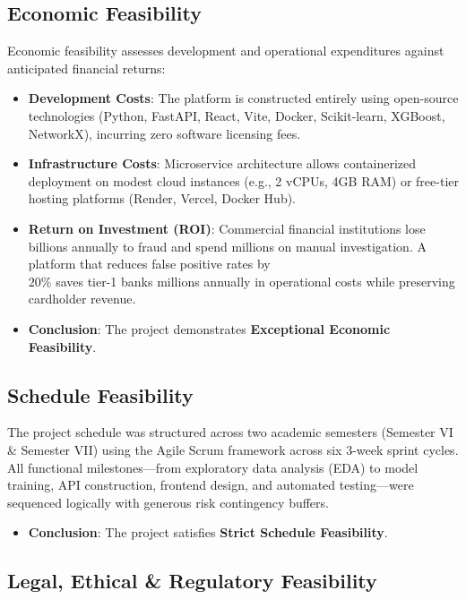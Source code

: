 \documentclass[12pt,a4paper,oneside]{report}
\begin{document}
\subsection{Economic Feasibility}

Economic feasibility assesses development and operational expenditures against anticipated financial returns:

\begin{itemize}[leftmargin=0.35in]
\item \textbf{Development Costs}: The platform is constructed entirely using open-source technologies (Python, FastAPI, React, Vite, Docker, Scikit-learn, XGBoost, NetworkX), incurring zero software licensing fees.
\item \textbf{Infrastructure Costs}: Microservice architecture allows containerized deployment on modest cloud instances (e.g., 2 vCPUs, 4GB RAM) or free-tier hosting platforms (Render, Vercel, Docker Hub).
\item \textbf{Return on Investment (ROI)}: Commercial financial institutions lose billions annually to fraud and spend millions on manual investigation. A platform that reduces false positive rates by \\$20\%$ saves tier-1 banks millions annually in operational costs while preserving cardholder revenue.
\item \textbf{Conclusion}: The project demonstrates \textbf{Exceptional Economic Feasibility}.
\end{itemize}

\subsection{Schedule Feasibility}

The project schedule was structured across two academic semesters (Semester VI \& Semester VII) using the Agile Scrum framework across six 3-week sprint cycles. All functional milestones---from exploratory data analysis (EDA) to model training, API construction, frontend design, and automated testing---were sequenced logically with generous risk contingency buffers.

\begin{itemize}[leftmargin=0.35in]
\item \textbf{Conclusion}: The project satisfies \textbf{Strict Schedule Feasibility}.
\end{itemize}

\subsection{Legal, Ethical \& Regulatory Feasibility}
\end{document}
